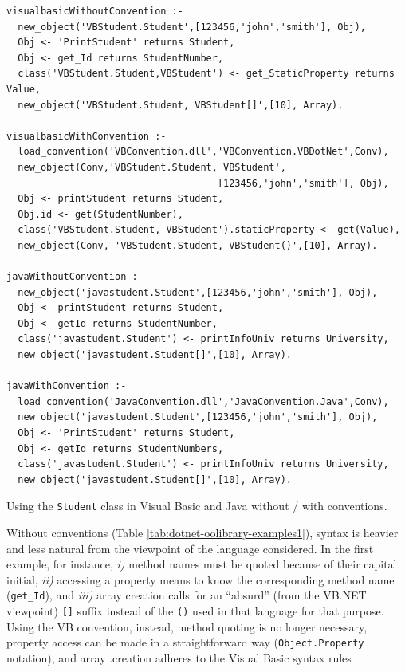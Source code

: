 \begin{table}
{\small
\begin{verbatim}
visualbasicWithoutConvention :-
  new_object('VBStudent.Student',[123456,'john','smith'], Obj),
  Obj <- 'PrintStudent' returns Student,
  Obj <- get_Id returns StudentNumber,
  class('VBStudent.Student,VBStudent') <- get_StaticProperty returns Value,
  new_object('VBStudent.Student, VBStudent[]',[10], Array).

visualbasicWithConvention :-
  load_convention('VBConvention.dll','VBConvention.VBDotNet',Conv),
  new_object(Conv,'VBStudent.Student, VBStudent',
                                     [123456,'john','smith'], Obj),
  Obj <- printStudent returns Student,
  Obj.id <- get(StudentNumber),
  class('VBStudent.Student, VBStudent').staticProperty <- get(Value),
  new_object(Conv, 'VBStudent.Student, VBStudent()',[10], Array).

javaWithoutConvention :-
  new_object('javastudent.Student',[123456,'john','smith'], Obj),
  Obj <- printStudent returns Student,
  Obj <- getId returns StudentNumber,
  class('javastudent.Student') <- printInfoUniv returns University,
  new_object('javastudent.Student[]',[10], Array).

javaWithConvention :-
  load_convention('JavaConvention.dll','JavaConvention.Java',Conv),
  new_object('javastudent.Student',[123456,'john','smith'], Obj),
  Obj <- 'PrintStudent' returns Student,
  Obj <- getId returns StudentNumbers,
  class('javastudent.Student') <- printInfoUniv returns University,
  new_object('javastudent.Student[]',[10], Array).
\end{verbatim}
}
  \caption{Using the \texttt{Student} class in Visual Basic and Java without / with conventions. }
  \label{tab:dotnet-oolibrary-examples1}
\end{table}

\noindent Without conventions (Table \ref{tab:dotnet-oolibrary-examples1}), syntax is heavier and less natural from the viewpoint of the language considered.
In the first example, for instance, \textit{i)} method names must be quoted because of their capital initial, \textit{ii)} accessing a property means to know the corresponding method name (\texttt{get\_Id}), and \textit{iii)} array creation calls for an ``absurd'' (from the VB.NET viewpoint) \texttt{[]} suffix instead of the \texttt{()} used in that language for that purpose.
Using the VB convention, instead, method quoting is no longer necessary, property access can be made in a straightforward way (\texttt{Object.Property} notation), and array .creation adheres to the Visual Basic syntax rules

